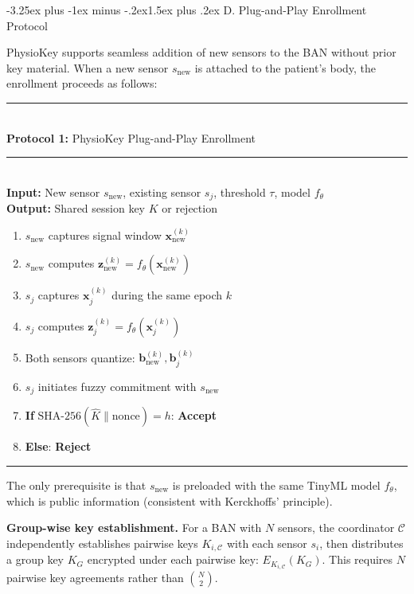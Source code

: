 \documentclass[10pt,twocolumn]{article}
\makeatletter
\renewcommand{\subsection}{\@startsection{subsection}{2}{\z@}%
  {-3.25ex plus -1ex minus -.2ex}{1.5ex plus .2ex}%
  {\normalfont\normalsize\bfseries\itshape}}
\makeatother
\begin{document}
\subsection{D. Plug-and-Play Enrollment Protocol}
\label{subsec:enrollment}

PhysioKey supports seamless addition of new sensors to the BAN without prior key material. When a new sensor $s_{\text{new}}$ is attached to the patient's body, the enrollment proceeds as follows:

\medskip
\noindent\rule{\columnwidth}{0.4pt}\\
\noindent\textbf{Protocol 1:} PhysioKey Plug-and-Play Enrollment\\
\noindent\rule{\columnwidth}{0.4pt}\\
\textbf{Input:} New sensor $s_{\text{new}}$, existing sensor $s_j$, threshold $\tau$, model $f_\theta$\\
\textbf{Output:} Shared session key $K$ or rejection
\begin{enumerate}
    \item $s_{\text{new}}$ captures signal window $\mathbf{x}_{\text{new}}^{(k)}$
    \item $s_{\text{new}}$ computes $\mathbf{z}_{\text{new}}^{(k)} = f_\theta(\mathbf{x}_{\text{new}}^{(k)})$
    \item $s_j$ captures $\mathbf{x}_j^{(k)}$ during the same epoch $k$
    \item $s_j$ computes $\mathbf{z}_j^{(k)} = f_\theta(\mathbf{x}_j^{(k)})$
    \item Both sensors quantize: $\mathbf{b}_{\text{new}}^{(k)}, \mathbf{b}_j^{(k)}$
    \item $s_j$ initiates fuzzy commitment with $s_{\text{new}}$
    \item \textbf{If} $\text{SHA-256}(\hat{K} \| \text{nonce}) = h$: \textbf{Accept}
    \item \textbf{Else}: \textbf{Reject}
\end{enumerate}
\noindent\rule{\columnwidth}{0.4pt}
\medskip

The only prerequisite is that $s_{\text{new}}$ is preloaded with the same TinyML model $f_\theta$, which is public information (consistent with Kerckhoffs' principle).

\textbf{Group-wise key establishment.} For a BAN with $N$ sensors, the coordinator $\mathcal{C}$ independently establishes pairwise keys $K_{i,\mathcal{C}}$ with each sensor $s_i$, then distributes a group key $K_G$ encrypted under each pairwise key: $E_{K_{i,\mathcal{C}}}(K_G)$. This requires $N$ pairwise key agreements rather than $\binom{N}{2}$.
\end{document}
